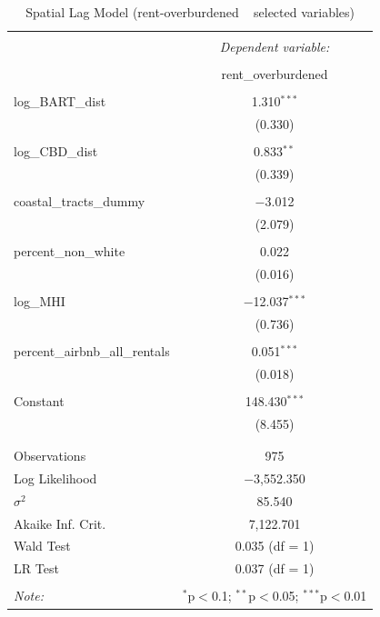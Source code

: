 \documentclass[10pt, letterpaper]{amsart}
\begin{document}
\begin{table}[!htbp] \centering 
\caption{Spatial Lag Model (rent-overburdened ~ selected variables)} 
\label{} 
\begin{tabular}{@{\extracolsep{5pt}}lc} 
\\[-1.8ex]\hline 
\hline \\[-1.8ex] 
& \multicolumn{1}{c}{\textit{Dependent variable:}} \\ 
\cline{2-2} 
\\[-1.8ex] & rent\_overburdened \\ 
\hline \\[-1.8ex] 
log\_BART\_dist & 1.310$^{***}$ \\ 
& (0.330) \\ 
& \\ 
log\_CBD\_dist & 0.833$^{**}$ \\ 
& (0.339) \\ 
& \\ 
coastal\_tracts\_dummy & $-$3.012 \\ 
& (2.079) \\ 
& \\ 
percent\_non\_white & 0.022 \\ 
& (0.016) \\ 
& \\ 
log\_MHI & $-$12.037$^{***}$ \\ 
& (0.736) \\ 
& \\ 
percent\_airbnb\_all\_rentals & 0.051$^{***}$ \\ 
& (0.018) \\ 
& \\ 
Constant & 148.430$^{***}$ \\ 
& (8.455) \\ 
& \\ 
\hline \\[-1.8ex] 
Observations & 975 \\ 
Log Likelihood & $-$3,552.350 \\ 
$\sigma^{2}$ & 85.540 \\ 
Akaike Inf. Crit. & 7,122.701 \\ 
Wald Test & 0.035 (df = 1) \\ 
LR Test & 0.037 (df = 1) \\ 
\hline 
\hline \\[-1.8ex] 
\textit{Note:}  & \multicolumn{1}{r}{$^{*}$p$<$0.1; $^{**}$p$<$0.05; $^{***}$p$<$0.01} \\ 
\end{tabular} 
\end{table} 
\end{document}

